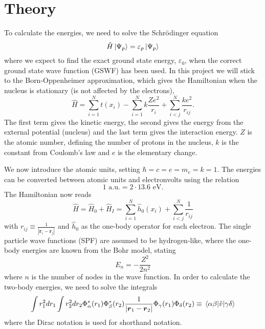 \section{Theory} \label{sec:theory}
To calculate the energies, we need to solve the Schrödinger equation
\begin{equation}
\hat{H}\ket{\Psi_p}=\varepsilon_p\ket{\Psi_p}
\end{equation}
where we expect to find the exact ground state energy, $\varepsilon_0$, when the correct ground state wave function (GSWF) has been used. In this project we will stick to the Born-Oppenheimer approximation, which gives the Hamiltonian when the nucleus is stationary (is not affected by the electrons),
\begin{equation}
\hat{H}=\sum_{i=1}^Nt(x_i)-\sum_{i=1}^Nk\frac{Ze^2}{r_i}+\sum_{i<j}^N\frac{ke^2}{r_{ij}}.
\end{equation}
The first term gives the kinetic energy, the second gives the energy from the external potential (nucleus) and the last term gives the interaction energy. $Z$ is the atomic number, defining the number of protons in the nucleus, $k$ is the constant from Coulomb's law and $e$ is the elementary change.

We now introduce the atomic units, setting $\hbar=c=e=m_e=k=1$. 
The energies can be converted between atomic units and electronvolts using the relation
\begin{equation}
1 \text{ a.u.} = 2\cdot13.6 \text{ eV}.
\end{equation}
The Hamiltonian now reads
\begin{equation}
\hat{H}=\hat{H}_0 + \hat{H}_I=\sum_{i=1}^N\hat{h}_0(x_i)+\sum_{i<j}^N\frac{1}{r_{ij}}
\end{equation}
with $r_{ij}\equiv\frac{1}{|\boldsymbol{r}_i-\boldsymbol{r}_j|}$ and $\hat{h}_0$ as the one-body operator for each electron. The single particle wave functions (SPF) are assumed to be hydrogen-like, where the one-body energies are known from the Bohr model, stating
\begin{equation}
E_n=-\frac{Z^2}{2n^2}
\end{equation}
where $n$ is the number of nodes in the wave function. In order to calculate the two-body energies, we need to solve the integrals 
\begin{equation}
\int r_1^2dr_1\int r_2^2dr_2 \Phi_{\alpha}^*(r_1)\Phi_{\beta}^*(r_2)\frac{1}{|\boldsymbol{r}_1-\boldsymbol{r}_2|}\Phi_{\gamma}(r_1)\Phi_{\delta}(r_2)\equiv\mel{\alpha\beta}{\hat{v}}{\gamma\delta}
\end{equation}
where the Dirac notation is used for shorthand notation. 

